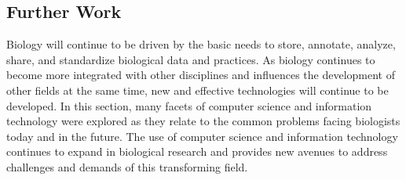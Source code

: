 \subsection{Further Work}

Biology will continue to be driven by the basic needs to store, annotate,
analyze, share, and standardize biological data and practices. As biology
continues to become more integrated with other disciplines and influences the
development of other fields at the same time, new and effective technologies
will continue to be developed. In this section, many facets of computer science
and information technology were explored as they relate to the common problems
facing biologists today and in the future.  The use of computer science and
information technology continues to expand in biological research and provides
new avenues to address challenges and demands of this transforming field.
